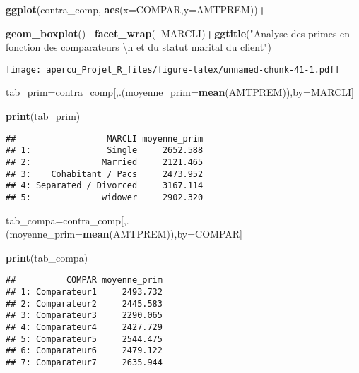 \documentclass[
]{article}
\newenvironment{Shaded}{\begin{snugshade}}{\end{snugshade}}
\newcommand{\CharTok}[1]{\textcolor[rgb]{0.31,0.60,0.02}{#1}}
\newcommand{\DataTypeTok}[1]{\textcolor[rgb]{0.13,0.29,0.53}{#1}}
\newcommand{\KeywordTok}[1]{\textcolor[rgb]{0.13,0.29,0.53}{\textbf{#1}}}
\newcommand{\NormalTok}[1]{#1}
\newcommand{\OperatorTok}[1]{\textcolor[rgb]{0.81,0.36,0.00}{\textbf{#1}}}
\newcommand{\StringTok}[1]{\textcolor[rgb]{0.31,0.60,0.02}{#1}}
\begin{document}
\begin{Shaded}
\begin{Highlighting}[]
\KeywordTok{ggplot}\NormalTok{(contra_comp, }\KeywordTok{aes}\NormalTok{(}\DataTypeTok{x=}\NormalTok{COMPAR,}\DataTypeTok{y=}\NormalTok{AMTPREM))}\OperatorTok{+}

\KeywordTok{geom_boxplot}\NormalTok{()}\OperatorTok{+}\KeywordTok{facet_wrap}\NormalTok{(}\OperatorTok{~}\NormalTok{MARCLI)}\OperatorTok{+}\KeywordTok{ggtitle}\NormalTok{(}\StringTok{"Analyse des primes en fonction des comparateurs }\CharTok{\textbackslash{}n}\StringTok{ et du statut marital du client"}\NormalTok{)}
\end{Highlighting}
\end{Shaded}

\texttt{[image: apercu\_Projet\_R\_files/figure-latex/unnamed-chunk-41-1.pdf]}

\begin{Shaded}
\begin{Highlighting}[]
\NormalTok{tab_prim=contra_comp[,.(}\DataTypeTok{moyenne_prim=}\KeywordTok{mean}\NormalTok{(AMTPREM)),by=MARCLI]}

\KeywordTok{print}\NormalTok{(tab_prim)}
\end{Highlighting}
\end{Shaded}

\begin{verbatim}
##                  MARCLI moyenne_prim
## 1:               Single     2652.588
## 2:              Married     2121.465
## 3:    Cohabitant / Pacs     2473.952
## 4: Separated / Divorced     3167.114
## 5:              widower     2902.320
\end{verbatim}

\begin{Shaded}
\begin{Highlighting}[]
\NormalTok{tab_compa=contra_comp[,.(}\DataTypeTok{moyenne_prim=}\KeywordTok{mean}\NormalTok{(AMTPREM)),by=COMPAR]}

\KeywordTok{print}\NormalTok{(tab_compa)}
\end{Highlighting}
\end{Shaded}

\begin{verbatim}
##          COMPAR moyenne_prim
## 1: Comparateur1     2493.732
## 2: Comparateur2     2445.583
## 3: Comparateur3     2290.065
## 4: Comparateur4     2427.729
## 5: Comparateur5     2544.475
## 6: Comparateur6     2479.122
## 7: Comparateur7     2635.944
\end{verbatim}
\end{document}
